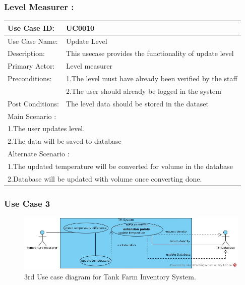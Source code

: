     \subsubsection{Level Measurer :}	
	\begin{center}
	\vspace*{1\baselineskip}	
	\begin{tabular}{|l|p{10cm}|}
		\hline
		Use Case ID: & UC0010 \\
		\hline
		Use Case Name: & Update Level \\
		\hline
		Description: & This usecase provides the functionality of update level \\
		\hline
		Primary Actor: & Level measurer \\
		\hline
		Preconditions: & 1.The level  must have already been verified by the staff\\ 
		& 2.The user should already be logged in the system \\
		\hline
		Post Conditions: & The level data should be stored in the dataset\\
		\hline
		\multicolumn{2}{|l|}{Main Scenario :} \\
		\hline
		\multicolumn{2}{|l|}{1.The user updates level.} \\
		\multicolumn{2}{|l|}{2.The data will be saved to database } \\
		\hline
		\multicolumn{2}{|l|}{Alternate Scenario :} \\
		\hline
		\multicolumn{2}{|l|}{1.The updated temperature will be converted for volume in the database} \\
		\multicolumn{2}{|l|}{2.Database will be updated with volume once converting done.} \\
		\hline
	\end{tabular}
	\end{center}
	
	
	
\newpage	
\subsubsection{Use Case 3}
\vspace*{1\baselineskip}
\begin{figure}[htbp]
	\begin{center}
		\includegraphics[width=1.00\linewidth]{./images/UC03.jpg}
		\caption{3rd Use case diagram for Tank Farm Inventory System.}
		\label{fig:UC03.jpg}
	\end{center}
\end{figure}

